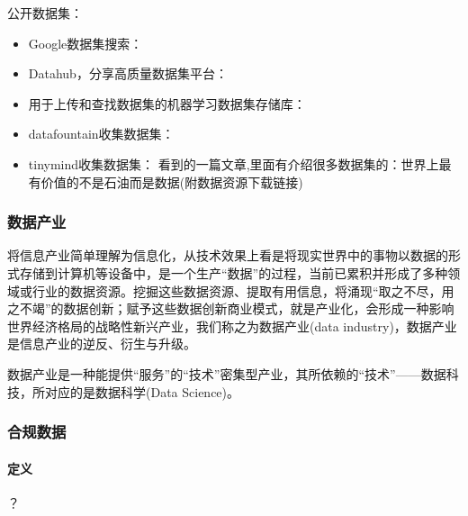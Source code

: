 \documentclass[letterpaper,10pt,english]{sphinxmanual}
\begin{document}
公开数据集：%
\begin{footnote}[907]\sphinxAtStartFootnote
{}
%
\end{footnote}
\begin{itemize}
\item {} 
Google数据集搜索：

\item {} 
Datahub，分享高质量数据集平台：

\item {} 
用于上传和查找数据集的机器学习数据集存储库：

\item {} 
datafountain收集数据集：

\item {} 
tinymind收集数据集：
看到的一篇文章,里面有介绍很多数据集的：世界上最有价值的不是石油而是数据(附数据资源下载链接)

\end{itemize}


\subsubsection{数据产业}
\label{\detokenize{chapter_data_dive/data_industry:id1}}\label{\detokenize{chapter_data_dive/data_industry::doc}}
将信息产业简单理解为信息化，从技术效果上看是将现实世界中的事物以数据的形式存储到计算机等设备中，是一个生产“数据”的过程，当前已累积并形成了多种领域或行业的数据资源。挖掘这些数据资源、提取有用信息，将涌现“取之不尽，用之不竭”的数据创新；赋予这些数据创新商业模式，就是产业化，会形成一种影响世界经济格局的战略性新兴产业，我们称之为数据产业(data
industry)，数据产业是信息产业的逆反、衍生与升级。

数据产业是一种能提供“服务”的“技术”密集型产业，其所依赖的“技术”——数据科技，所对应的是数据科学(Data
Science)。


\subsubsection{合规数据}
\label{\detokenize{chapter_data_dive/compliance_data:id1}}\label{\detokenize{chapter_data_dive/compliance_data::doc}}

\paragraph{定义}
\label{\detokenize{chapter_data_dive/compliance_data:id2}}
？
\end{document}
